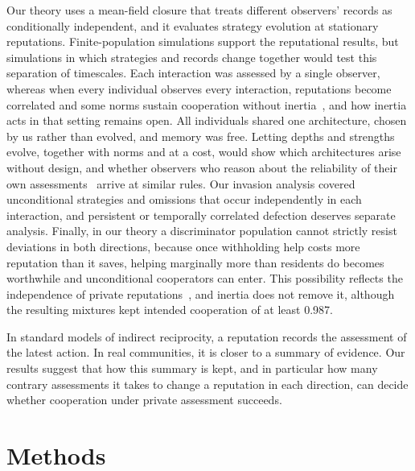 \documentclass[10pt]{wlscirep}
\theoremstyle{plain}
\theoremstyle{remark}
\begin{document}
Our theory uses a mean-field closure that treats different observers' records as conditionally independent, and it evaluates strategy evolution at stationary reputations. Finite-population simulations support the reputational results, but simulations in which strategies and records change together would test this separation of timescales. Each interaction was assessed by a single observer, whereas when every individual observes every interaction, reputations become correlated and some norms sustain cooperation without inertia~\cite{fujimoto2023,murase2024synchronization}, and how inertia acts in that setting remains open. All individuals shared one architecture, chosen by us rather than evolved, and memory was free. Letting depths and strengths evolve, together with norms and at a cost, would show which architectures arise without design, and whether observers who reason about the reliability of their own assessments~\cite{pandula2024,morsky2024} arrive at similar rules. Our invasion analysis covered unconditional strategies and omissions that occur independently in each interaction, and persistent or temporally correlated defection deserves separate analysis. Finally, in our theory a discriminator population cannot strictly resist deviations in both directions, because once withholding help costs more reputation than it saves, helping marginally more than residents do becomes worthwhile and unconditional cooperators can enter. This possibility reflects the independence of private reputations~\cite{murase2024synchronization}, and inertia does not remove it, although the resulting mixtures kept intended cooperation of at least 0.987.

In standard models of indirect reciprocity, a reputation records the assessment of the latest action. In real communities, it is closer to a summary of evidence. Our results suggest that how this summary is kept, and in particular how many contrary assessments it takes to change a reputation in each direction, can decide whether cooperation under private assessment succeeds.

\section*{Methods}
\label{sec:methods}
\end{document}
